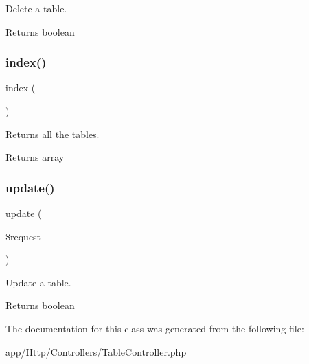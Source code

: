 Delete a table.

\begin{DoxyReturn}{Returns}
boolean 
\end{DoxyReturn}
\mbox{\label{class_app_1_1_http_1_1_controllers_1_1_table_controller_a149eb92716c1084a935e04a8d95f7347}} 
\subsubsection{\texorpdfstring{index()}{index()}}
{\footnotesize\ttfamily index (\begin{DoxyParamCaption}{ }\end{DoxyParamCaption})}

Returns all the tables.

\begin{DoxyReturn}{Returns}
array 
\end{DoxyReturn}
\mbox{\label{class_app_1_1_http_1_1_controllers_1_1_table_controller_ab7b27a90191560dcef32126b0945db0d}} 
\subsubsection{\texorpdfstring{update()}{update()}}
{\footnotesize\ttfamily update (\begin{DoxyParamCaption}\item[{}]{\$request }\end{DoxyParamCaption})}

Update a table.

\begin{DoxyReturn}{Returns}
boolean 
\end{DoxyReturn}


The documentation for this class was generated from the following file\+:\begin{DoxyCompactItemize}
\item 
app/\+Http/\+Controllers/Table\+Controller.\+php\end{DoxyCompactItemize}
